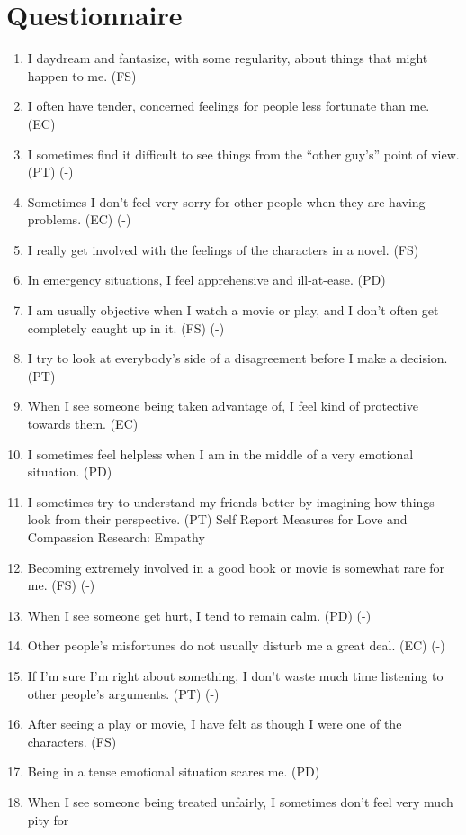 \section{Questionnaire}
\begin{enumerate}
\item I daydream and fantasize, with some regularity, about things that might happen to me.
(FS)
\item I often have tender, concerned feelings for people less fortunate than me. (EC)
\item I sometimes find it difficult to see things from the ``other guy's'' point of view. (PT) (-)
\item Sometimes I don't feel very sorry for other people when they are having problems. (EC)
(-)
\item I really get involved with the feelings of the characters in a novel. (FS)
\item In emergency situations, I feel apprehensive and ill-at-ease. (PD)
\item I am usually objective when I watch a movie or play, and I don't often get completely
caught up in it. (FS) (-)
\item I try to look at everybody's side of a disagreement before I make a decision. (PT)
\item When I see someone being taken advantage of, I feel kind of protective towards them.
(EC)
\item I sometimes feel helpless when I am in the middle of a very emotional situation. (PD)
\item I sometimes try to understand my friends better by imagining how things look from
their perspective. (PT) 
Self Report Measures for Love and Compassion Research: Empathy
\item Becoming extremely involved in a good book or movie is somewhat rare for me. (FS) (-)
\item When I see someone get hurt, I tend to remain calm. (PD) (-)
\item Other people's misfortunes do not usually disturb me a great deal. (EC) (-)
\item If I'm sure I'm right about something, I don't waste much time listening to other
people's arguments. (PT) (-)
\item After seeing a play or movie, I have felt as though I were one of the characters. (FS)
\item Being in a tense emotional situation scares me. (PD)
\item When I see someone being treated unfairly, I sometimes don't feel very much pity for

\end{enumerate}
